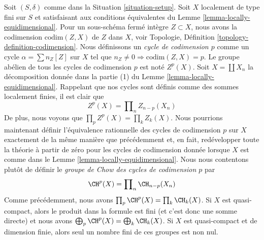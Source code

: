 \noindent
Soit $(S, \delta)$ comme dans la Situation \ref{situation-setup}. Soit $X$
localement de type fini sur $S$ et satisfaisant aux conditions équivalentes
du Lemme \ref{lemma-locally-equidimensional}. Pour un sous-schéma fermé
intègre $Z \subset X$, nous avons la codimension $\text{codim}(Z, X)$
de $Z$ dans $X$, voir Topologie, Définition \ref{topology-definition-codimension}.
Nous définissons un {\it cycle de codimension $p$} comme un cycle $\alpha = \sum n_Z[Z]$
sur $X$ tel que $n_Z \not = 0 \Rightarrow \text{codim}(Z, X) = p$.
Le groupe abélien de tous les cycles de codimension $p$ est noté $Z^p(X)$.
Soit $X = \coprod X_n$ la décomposition donnée dans la
partie (1) du Lemme \ref{lemma-locally-equidimensional}.
Rappelant que nos cycles sont définis comme des sommes localement finies, il est clair que
$$
Z^p(X) = \prod\nolimits_n Z_{n - p}(X_n)
$$
De plus, nous voyons que $\prod_p Z^p(X) = \prod_k Z_k(X)$. Nous pourrions maintenant définir
l'équivalence rationnelle des cycles de codimension $p$ sur $X$ exactement de la même
manière que précédemment et, en fait, redévelopper toute la théorie à partir de zéro
pour les cycles de codimension donnée lorsque $X$ est comme dans le
Lemme \ref{lemma-locally-equidimensional}. Nous nous contentons plutôt de
définir le {\it groupe de Chow des cycles de codimension $p$} par
$$
\CH^p(X) = \prod\nolimits_n \CH_{n - p}(X_n)
$$
Comme précédemment, nous avons $\prod_p \CH^p(X) = \prod_k \CH_k(X)$.
Si $X$ est quasi-compact, alors le produit dans la formule est fini
(et c'est donc une somme directe) et nous avons
$\bigoplus_p \CH^p(X) = \bigoplus_k \CH_k(X)$. Si $X$ est quasi-compact
et de dimension finie, alors seul un nombre fini de ces groupes
est non nul.

